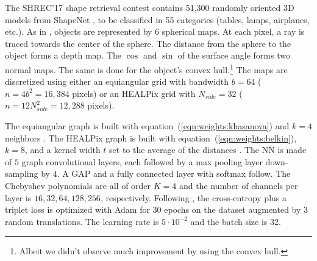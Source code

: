 \documentclass{article} %
\newcommand{\todo}[1]{{\color[rgb]{.6,.1,.6}{#1}}}
\newcommand{\eqnref}[1]{equation~(\ref{eqn:#1})}
\begin{document}
The SHREC'17 shape retrieval contest \citep{shrec17} contains 51,300 randomly oriented 3D models from ShapeNet \citep{shapenet}, to be classified in 55 categories (tables, lamps, airplanes, etc.).
As in \citet{cohen2018sphericalcnn}, objects are represented by 6 spherical maps.
At each pixel, a ray is traced towards the center of the sphere.
The distance from the sphere to the object forms a depth map.
The $\cos$ and $\sin$ of the surface angle forms two normal maps.
The same is done for the object's convex hull.\footnote{Albeit we didn't observe much improvement by using the convex hull.}
The maps are discretized using either an equiangular grid with bandwidth $b = 64$ ($n = 4 b^2 = 16,384$ pixels) or an HEALPix grid with $N_{side} = 32$ ($n = 12 N_{side}^2 = 12,288$ pixels).

The equiangular graph is built with \eqnref{weights:khasanova} and $k = 4$ neighbors \citep[following][]{khasanova2017sphericalcnn}.
The HEALPix graph is built with \eqnref{weights:belkin}, $k = 8$, and a kernel width $t$ set to the average of the distances \citep[following][]{perraudin2019deepspherecosmo}.
\todo{Following Esteves or Cohen?}
The NN is made of $5$ graph convolutional layers, each followed by a max pooling layer down-sampling by $4$.
A GAP and a fully connected layer with softmax follow.
The Chebyshev polynomials are all of order $K=4$ and the number of channels per layer is $16, 32, 64, 128, 256$, respectively.
Following \citet{esteves2018sphericalcnn}, the cross-entropy plus a triplet loss is optimized with Adam for 30 epochs on the dataset augmented by 3 random translations.
The learning rate is $5 \cdot 10^{-2}$ and the batch size is 32.
\end{document}
